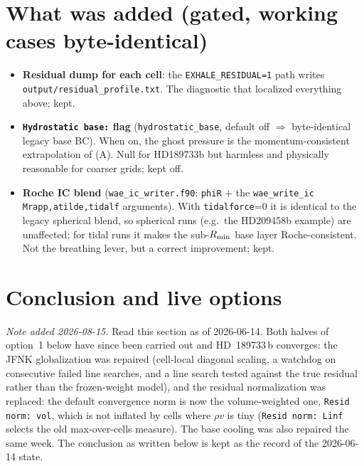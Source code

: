 \documentclass[english,a4paper]{my_memo}
\newcommand{\code}[1]{\texttt{#1}}
\begin{document}
\section{What was added (gated, working cases byte-identical)}
\begin{itemize}\itemsep2pt
  \item \textbf{Residual dump for each cell}: the \code{EXHALE\_RESIDUAL=1} path
        writes \code{output/residual\_profile.txt}. The diagnostic that
        localized everything above; kept.
  \item \textbf{\code{Hydrostatic base:} flag} (\code{hydrostatic\_base},
        default off $\Rightarrow$ byte-identical legacy base BC). When on,
        the ghost pressure is the momentum-consistent extrapolation of (A).
        Null for HD189733b but harmless and physically reasonable for
        coarser grids; kept off.
  \item \textbf{Roche IC blend} (\code{wae\_ic\_writer.f90}: \code{phiR} +
        the \code{wae\_write\_ic} \code{Mrapp,atilde,tidalf} arguments).
        With \code{tidalforce}=0 it is identical to the legacy spherical
        blend, so spherical runs (e.g.\ the HD209458b example) are
        unaffected; for tidal runs it makes the sub-$R_{\rm min}$ base layer
        Roche-consistent. Not the breathing lever, but a correct
        improvement; kept.
\end{itemize}

\section{Conclusion and live options}

\emph{Note added 2026-08-15.} Read this section as of 2026-06-14.  Both halves
of option~1 below have since been carried out and HD~189733\,b converges: the
JFNK globalization was repaired (cell-local diagonal scaling, a watchdog on
consecutive failed line searches, and a line search tested against the true
residual rather than the frozen-weight model), and the residual
normalization was replaced: the default convergence norm is now the
volume-weighted one, \code{Resid norm: vol}, which is not inflated by cells
where $\rho v$ is tiny (\code{Resid norm: Linf} selects the old
max-over-cells measure).  The base cooling was also repaired the same week.  The conclusion as written
below is kept as the record of the 2026-06-14 state.
\end{document}
